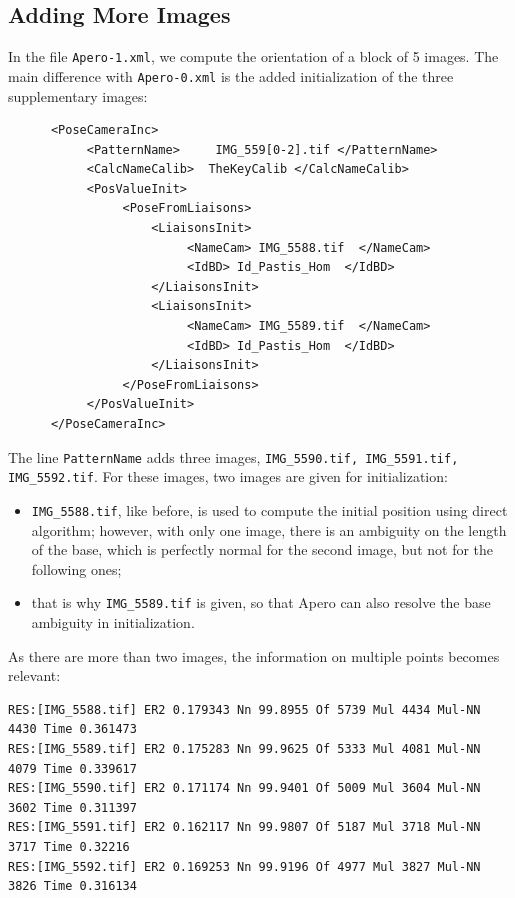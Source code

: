 \subsection{Adding More Images}

In the file {\tt Apero-1.xml}, we compute the orientation of a block of 
5 images.  The main difference with {\tt Apero-0.xml} is the added
initialization of the three supplementary images:

{\scriptsize
\begin{verbatim}
      <PoseCameraInc>
           <PatternName>     IMG_559[0-2].tif </PatternName>
           <CalcNameCalib>  TheKeyCalib </CalcNameCalib>
           <PosValueInit>
                <PoseFromLiaisons>
                    <LiaisonsInit>
                         <NameCam> IMG_5588.tif  </NameCam>
                         <IdBD> Id_Pastis_Hom  </IdBD>
                    </LiaisonsInit>
                    <LiaisonsInit>
                         <NameCam> IMG_5589.tif  </NameCam>
                         <IdBD> Id_Pastis_Hom  </IdBD>
                    </LiaisonsInit>
                </PoseFromLiaisons>
           </PosValueInit>
      </PoseCameraInc>
\end{verbatim}
}

The line {\tt PatternName} adds three images, {\tt  IMG\_5590.tif, 
IMG\_5591.tif, IMG\_5592.tif}. For these images, two images are 
given for initialization:

\begin{itemize}
   \item {\tt IMG\_5588.tif}, like before, is used to compute the
        initial position using direct algorithm; however, with only
        one image, there is an ambiguity on the length of the base,
        which is perfectly normal for the second image, but not for
        the following ones;

   \item that is why {\tt IMG\_5589.tif} is given, so that Apero can also
         resolve the base ambiguity in initialization. 

\end{itemize}


As there are more than two images, the information on multiple points
becomes relevant:

{\scriptsize
\begin{verbatim}
RES:[IMG_5588.tif] ER2 0.179343 Nn 99.8955 Of 5739 Mul 4434 Mul-NN 4430 Time 0.361473
RES:[IMG_5589.tif] ER2 0.175283 Nn 99.9625 Of 5333 Mul 4081 Mul-NN 4079 Time 0.339617
RES:[IMG_5590.tif] ER2 0.171174 Nn 99.9401 Of 5009 Mul 3604 Mul-NN 3602 Time 0.311397
RES:[IMG_5591.tif] ER2 0.162117 Nn 99.9807 Of 5187 Mul 3718 Mul-NN 3717 Time 0.32216
RES:[IMG_5592.tif] ER2 0.169253 Nn 99.9196 Of 4977 Mul 3827 Mul-NN 3826 Time 0.316134
\end{verbatim}
}

